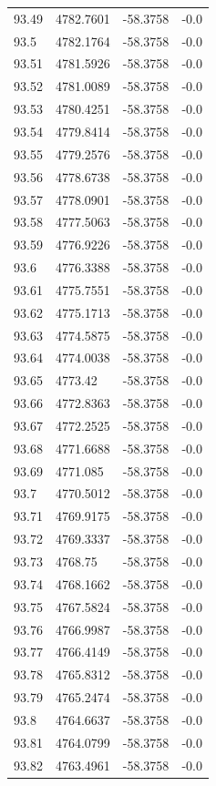 \begin{table}[H]
\begin{tabular}{llll}
93.49 & 4782.7601 & -58.3758 & -0.0 \\
93.5 & 4782.1764 & -58.3758 & -0.0 \\
93.51 & 4781.5926 & -58.3758 & -0.0 \\
93.52 & 4781.0089 & -58.3758 & -0.0 \\
93.53 & 4780.4251 & -58.3758 & -0.0 \\
93.54 & 4779.8414 & -58.3758 & -0.0 \\
93.55 & 4779.2576 & -58.3758 & -0.0 \\
93.56 & 4778.6738 & -58.3758 & -0.0 \\
93.57 & 4778.0901 & -58.3758 & -0.0 \\
93.58 & 4777.5063 & -58.3758 & -0.0 \\
93.59 & 4776.9226 & -58.3758 & -0.0 \\
93.6 & 4776.3388 & -58.3758 & -0.0 \\
93.61 & 4775.7551 & -58.3758 & -0.0 \\
93.62 & 4775.1713 & -58.3758 & -0.0 \\
93.63 & 4774.5875 & -58.3758 & -0.0 \\
93.64 & 4774.0038 & -58.3758 & -0.0 \\
93.65 & 4773.42 & -58.3758 & -0.0 \\
93.66 & 4772.8363 & -58.3758 & -0.0 \\
93.67 & 4772.2525 & -58.3758 & -0.0 \\
93.68 & 4771.6688 & -58.3758 & -0.0 \\
93.69 & 4771.085 & -58.3758 & -0.0 \\
93.7 & 4770.5012 & -58.3758 & -0.0 \\
93.71 & 4769.9175 & -58.3758 & -0.0 \\
93.72 & 4769.3337 & -58.3758 & -0.0 \\
93.73 & 4768.75 & -58.3758 & -0.0 \\
93.74 & 4768.1662 & -58.3758 & -0.0 \\
93.75 & 4767.5824 & -58.3758 & -0.0 \\
93.76 & 4766.9987 & -58.3758 & -0.0 \\
93.77 & 4766.4149 & -58.3758 & -0.0 \\
93.78 & 4765.8312 & -58.3758 & -0.0 \\
93.79 & 4765.2474 & -58.3758 & -0.0 \\
93.8 & 4764.6637 & -58.3758 & -0.0 \\
93.81 & 4764.0799 & -58.3758 & -0.0 \\
93.82 & 4763.4961 & -58.3758 & -0.0 \\

\end{tabular}
\end{table}
